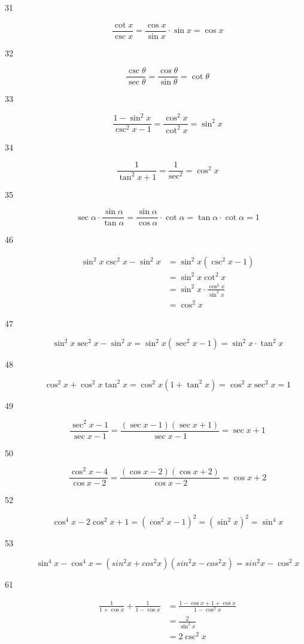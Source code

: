 \documentclass[fleqn,addpoints]{exam}
\begin{document}
\begin{description}
\item[31]
\[
  \frac{\cot x}{\csc x} = \frac{\cos x}{\sin x} \cdot \sin x = \cos x
\]

\item[32]
\[
  \frac{\csc \theta}{\sec \theta} = \frac{\cos \theta}{\sin \theta} = \cot \theta
\]

\item[33]
\[
  \frac{1 - \sin^2 x}{\csc^2 x - 1} = \frac{\cos^2 x}{\cot^2 x} = \sin^2 x
\]

\item[34]
\[
  \frac{1}{\tan^2 x +1} =   \frac{1}{\sec^2} = \cos^2 x
\]

\item[35]
\[
  \sec \alpha \cdot \frac{\sin \alpha}{\tan \alpha} = \frac{\sin \alpha}{\cos \alpha} \cdot \cot \alpha 
    = \tan \alpha \cdot \cot \alpha = 1
\]

\item[46]
\begin{align*}
  \sin^2 x \csc^2 x - \sin^2 x &= \sin^2 x (\csc^2 x - 1)  \\
  &= \sin^2 x \cot^2 x \\
  &= \sin^2 x \cdot \frac{\cos^2 x}{\sin^2 x} \\
  &= \cos^2 x
\end{align*}


\item[47]
\[
  \sin^2 x \sec^2 x - \sin^2 x =   \sin^2 x (\sec^2 x - 1)  = \sin^2 x \cdot \tan^2 x 
\]

\item[48]
\[
  \cos^2 x + \cos^2 x \tan^2 x = \cos^2 x (1 + \tan^2 x) =  \cos^2 x \sec^2 x = 1
\]

\item[49]
\[
  \frac{\sec^2 x - 1}{\sec x - 1} =   \frac{(\sec x - 1)(\sec x + 1)}{\sec x - 1} = \sec x + 1
\]

\item[50]
\[
  \frac{\cos^2 x - 4}{\cos x - 2} =   \frac{(\cos x - 2)(\cos x + 2)}{\cos x - 2} = \cos x + 2
\]

\item[52]
\[
  \cos^4 x - 2 \cos^2 x + 1 = (\cos^2 x - 1)^2 = (\sin^2 x)^2 = \sin^4 x
\]

\item[53]
\[
  \sin^4x - \cos^4 x = (sin^2 x + cos^2 x) (sin^2 x - cos^2 x) = sin^2 x - \cos^2 x
\]

\item[61]
\begin{align*}
  \frac{1}{1 + \cos x} +   \frac{1}{1 - \cos x} &= \frac{1 - \cos x + 1 + \cos x}{1 - \cos^2 x} \\
  &= \frac{2}{\sin^2 x} \\
  &= 2 \csc^2 x
\end{align*}



\end{description}
\end{document}
